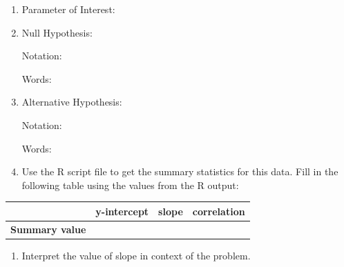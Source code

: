 \documentclass[
]{report}
\providecommand{\tightlist}{%
  \setlength{\itemsep}{0pt}\setlength{\parskip}{0pt}}
\begin{document}
\begin{enumerate}
\def\labelenumi{\alph{enumi}.}
\item
  Parameter of Interest:
  \vspace{0.3in}
\item
  Null Hypothesis:

  Notation:
  \vspace{0.3in}

  Words:
  \vspace{0.5in}
\item
  Alternative Hypothesis:

  Notation:
  \vspace{0.3in}

  Words:
  \vspace{0.5in}
\item
  Use the R script file to get the summary statistics for this data. Fill in the following table using the values from the R output:
\end{enumerate}

\begingroup
\setlength{\tabcolsep}{14pt}
\renewcommand{\arraystretch}{2}
\begin{center}
\begin{tabular}{|c|p{1in}|p{1in}|p{1in}|}
\hline
 & y-intercept & slope & correlation \\ \hline
 \textbf{Summary value} & & & \\ \hline
\end{tabular}
\end{center}
\endgroup

\begin{enumerate}
\def\labelenumi{\alph{enumi}.}
\setcounter{enumi}{4}
\tightlist
\item
  Interpret the value of slope in context of the problem.
\end{enumerate}

\vspace{0.3in}
\end{document}
